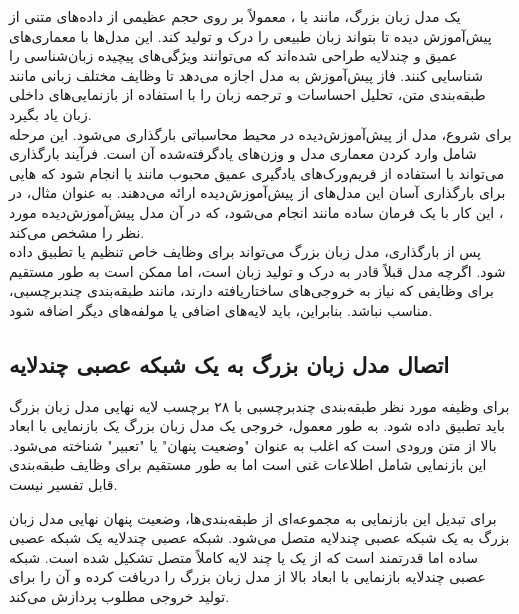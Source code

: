 یک مدل زبان بزرگ، مانند  یا ، معمولاً بر روی حجم عظیمی از داده‌های متنی از پیش‌آموزش دیده تا بتواند زبان طبیعی را درک و تولید کند. این مدل‌ها با معماری‌های عمیق و چندلایه طراحی شده‌اند که می‌توانند ویژگی‌های پیچیده زبان‌شناسی را شناسایی کنند. فاز پیش‌آموزش به مدل اجازه می‌دهد تا وظایف مختلف زبانی مانند طبقه‌بندی متن، تحلیل احساسات و ترجمه زبان را با استفاده از بازنمایی‌های داخلی زبان یاد بگیرد.
\\
برای شروع، مدل از پیش‌آموزش‌دیده در محیط محاسباتی بارگذاری می‌شود. این مرحله شامل وارد کردن معماری مدل و وزن‌های یادگرفته‌شده آن است. فرآیند بارگذاری می‌تواند با استفاده از فریم‌ورک‌های یادگیری عمیق محبوب مانند  یا  انجام شود که  هایی برای بارگذاری آسان این مدل‌های از پیش‌آموزش‌دیده ارائه می‌دهند.
به عنوان مثال، در ، این کار با یک فرمان ساده مانند  انجام می‌شود، که در آن  مدل پیش‌آموزش‌دیده مورد نظر را مشخص می‌کند.
\\
پس از بارگذاری، مدل زبان بزرگ می‌تواند برای وظایف خاص تنظیم یا تطبیق داده شود. اگرچه مدل قبلاً قادر به درک و تولید زبان است، اما ممکن است به طور مستقیم برای وظایفی که نیاز به خروجی‌های ساختاریافته دارند، مانند طبقه‌بندی چند‌برچسبی، مناسب نباشد. بنابراین، باید لایه‌های اضافی یا مولفه‌های دیگر اضافه شود.
\subsection{اتصال مدل زبان بزرگ به یک شبکه عصبی چندلایه}

برای وظیفه مورد نظر طبقه‌بندی چند‌برچسبی با ۲۸ برچسب لایه نهایی مدل زبان بزرگ باید تطبیق داده شود. به طور معمول، خروجی یک مدل زبان بزرگ یک بازنمایی با ابعاد بالا از متن ورودی است که اغلب به عنوان "وضعیت پنهان" یا "تعبیر" شناخته می‌شود. این بازنمایی شامل اطلاعات غنی است اما به طور مستقیم برای وظایف طبقه‌بندی قابل تفسیر نیست.

برای تبدیل این بازنمایی به مجموعه‌ای از طبقه‌بندی‌ها، وضعیت پنهان نهایی مدل زبان بزرگ به یک شبکه عصبی چندلایه متصل می‌شود. شبکه عصبی چندلایه یک شبکه عصبی ساده اما قدرتمند است که از یک یا چند لایه کاملاً متصل تشکیل شده است. شبکه عصبی چندلایه بازنمایی با ابعاد بالا از مدل زبان بزرگ را دریافت کرده و آن را برای تولید خروجی مطلوب پردازش می‌کند.

